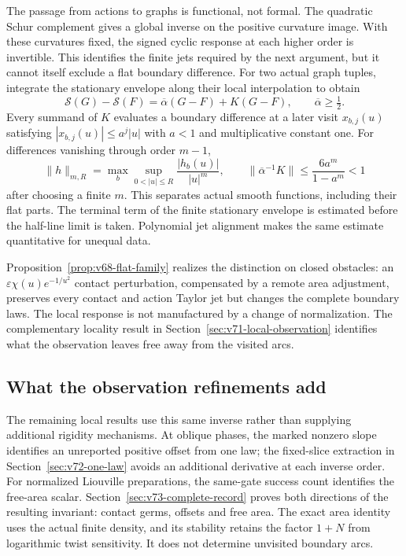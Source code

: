 The passage from actions to graphs is functional, not formal.
The quadratic Schur complement gives a global inverse on the positive
curvature image.  With these curvatures fixed, the signed cyclic
response at each higher order is invertible.  This identifies the finite
jets required by the next argument, but it cannot itself exclude a flat
boundary difference.  For two actual graph tuples, integrate the
stationary envelope along their local interpolation to obtain
\begin{equation}\label{eq:v75-envelope}
 \mathcal S(G)-\mathcal S(F)=\overline\alpha(G-F)+K(G-F),
 \qquad \overline\alpha\ge\tfrac12.
\end{equation}
Every summand of $K$ evaluates a boundary difference at a later visit
$x_{b,j}(u)$ satisfying $|x_{b,j}(u)|\le a^j|u|$ with $a<1$ and
multiplicative constant one.  For differences vanishing through order
$m-1$,
\[
 \|h\|_{m,R}=\max_b\sup_{0<|u|\le R}\frac{|h_b(u)|}{|u|^m},
 \qquad
 \|\overline\alpha^{-1}K\|\le\frac{6a^m}{1-a^m}<1
\]
after choosing a finite $m$.  This separates actual smooth functions,
including their flat parts.  The terminal term of the finite stationary
envelope is estimated before the half-line limit is taken.  Polynomial
jet alignment makes the same estimate quantitative for unequal data.

Proposition~\ref{prop:v68-flat-family} realizes the distinction on
closed obstacles: an $\varepsilon\chi(u)e^{-1/u^2}$ contact
perturbation, compensated by a remote area adjustment, preserves every
contact and action Taylor jet but changes the complete boundary laws.
The local response is not manufactured by a change of normalization.
The complementary locality result in Section~\ref{sec:v71-local-observation}
identifies what the observation leaves free away from the visited arcs.

\subsection{What the observation refinements add}

The remaining local results use this same inverse rather than supplying
additional rigidity mechanisms.  At oblique phases, the marked nonzero
slope identifies an unreported positive offset from one law; the
fixed-slice extraction in Section~\ref{sec:v72-one-law} avoids an
additional derivative at each inverse order.  For normalized Liouville
preparations, the same-gate success count identifies the free-area
scalar.  Section~\ref{sec:v73-complete-record} proves both directions
of the resulting invariant: contact germs, offsets and free area.
The exact area identity uses the actual finite density, and its
stability retains the factor $1+N$ from logarithmic twist sensitivity.
It does not determine unvisited boundary arcs.


